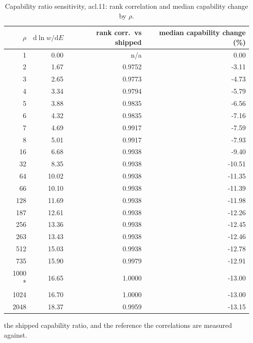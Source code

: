 \begin{table}[htbp]
  \centering
  \caption{Capability ratio sensitivity, acl.11: rank correlation and median capability change by $\rho$.}
  \label{tab:rho-acl-11-summary}
  \begin{tabular}{r r r r}
    \toprule
    $\rho$ & $\mathrm{d}\ln w/\mathrm{d}E$ & rank corr.\ vs shipped & median capability change (\%) \\
    \midrule
    1 & 0.00 & n/a & 0.00 \\
    2 & 1.67 & 0.9752 & -3.11 \\
    3 & 2.65 & 0.9773 & -4.73 \\
    4 & 3.34 & 0.9794 & -5.79 \\
    5 & 3.88 & 0.9835 & -6.56 \\
    6 & 4.32 & 0.9835 & -7.16 \\
    7 & 4.69 & 0.9917 & -7.59 \\
    8 & 5.01 & 0.9917 & -7.93 \\
    16 & 6.68 & 0.9938 & -9.40 \\
    32 & 8.35 & 0.9938 & -10.51 \\
    64 & 10.02 & 0.9938 & -11.35 \\
    66 & 10.10 & 0.9938 & -11.39 \\
    128 & 11.69 & 0.9938 & -11.98 \\
    187 & 12.61 & 0.9938 & -12.26 \\
    256 & 13.36 & 0.9938 & -12.45 \\
    263 & 13.43 & 0.9938 & -12.46 \\
    512 & 15.03 & 0.9938 & -12.78 \\
    735 & 15.90 & 0.9979 & -12.91 \\
    1000 * & 16.65 & 1.0000 & -13.00 \\
    1024 & 16.70 & 1.0000 & -13.00 \\
    2048 & 18.37 & 0.9959 & -13.15 \\
    \bottomrule
  \end{tabular}
  \par\smallskip\footnotesize * the shipped capability ratio, and the reference the correlations are measured against.
\end{table}
